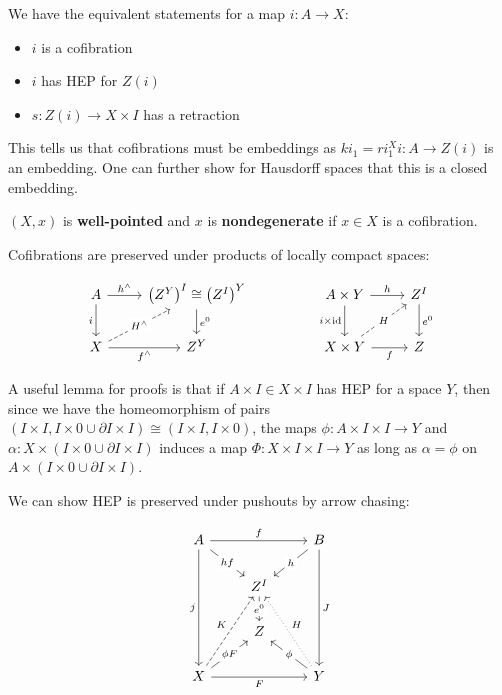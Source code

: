 We have the equivalent statements for a map $i:A\to X$:

\begin{itemize}
    \item $i$ is a cofibration
    \item $i$ has HEP for $Z(i)$
    \item $s:Z(i)\to X\times I$ has a retraction
\end{itemize}

This tells us that cofibrations must be embeddings as $ki_1=ri_1^Xi:A\to Z(i)$ is an embedding. One can further show for Hausdorff spaces that this is a closed embedding.

$(X,x)$ is \textbf{well-pointed} and $x$ is \textbf{nondegenerate} if $x\in X$ is a cofibration.

Cofibrations are preserved under products of locally compact spaces:

\[\begin{tikzcd}
	A & {\left(Z^Y\right)^I\cong\left(Z^I\right)^Y} && {A\times Y} & {Z^I} \\
	X & {Z^Y} && {X\times Y} & Z
	\arrow["i"', from=1-1, to=2-1]
	\arrow["{h^\land}", from=1-1, to=1-2]
	\arrow["{f^\land}"', from=2-1, to=2-2]
	\arrow["{e^0}", from=1-2, to=2-2]
	\arrow["{H^\land}"{description}, dashed, from=2-1, to=1-2]
	\arrow["h", from=1-4, to=1-5]
	\arrow["f"', from=2-4, to=2-5]
	\arrow["{e^0}", from=1-5, to=2-5]
	\arrow["i\times\id"', from=1-4, to=2-4]
	\arrow["H"{description}, dashed, from=2-4, to=1-5]
\end{tikzcd}\]

A useful lemma for proofs is that if $A\times I\in X\times I$ has HEP for a space $Y$, then since we have the homeomorphism of pairs $\left(I\times I,I\times0\cup\partial I\times I\right)\cong\left(I\times I,I\times0\right)$, the maps $\phi:A\times I\times I\to Y$ and $\alpha:X\times\left(I\times0\cup\partial I\times I\right)$ induces a map $\Phi:X\times I\times I\to Y$ as long as $\alpha=\phi$ on $A\times\left(I\times0\cup\partial I\times I\right)$. 

We can show HEP is preserved under pushouts by arrow chasing:

\[\begin{tikzcd}
	A && B \\
	& {Z^I} \\
	& Z \\
	X && Y
	\arrow["j"', from=1-1, to=4-1]
	\arrow["f", from=1-1, to=1-3]
	\arrow["F"', from=4-1, to=4-3]
	\arrow["J", from=1-3, to=4-3]
	\arrow["h"{description}, from=1-3, to=2-2]
	\arrow["\phi"{description}, from=4-3, to=3-2]
	\arrow["hf"{description}, from=1-1, to=2-2]
	\arrow["{\phi F}"{description}, from=4-1, to=3-2]
	\arrow["K", dashed, from=4-1, to=2-2]
	\arrow["H"', dotted, from=4-3, to=2-2]
	\arrow["{e^0}"{description}, from=2-2, to=3-2]
\end{tikzcd}\]

